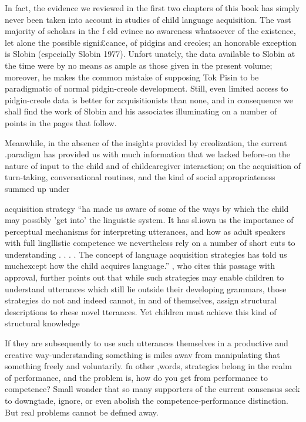 In fact, the evidence we reviewed in the first two chapters of this book has simply never been taken into account in studies of child language acquisition. The vast majority of scholars in the f eld evince no awareness whatsoever of the existence, let alone the possible signi£cance, of pidgins and creoles; an honorable exception is Slobin (especially Slobin 1977). Unfort unately, the data available to Slobin at the time were by no means as ample as those given in the present volume; moreover, he makes the common mistake of supposing Tok Pisin to be paradigmatic of normal pidgin-creole development. Still, even limited access to pidgin-creole data is better for acquisitionists than none, and in consequence we shall find the work of Slobin and his associates illuminating on a number of points in the pages that
follow.

Meanwhile, in the absence of the insights provided by creolization, the current .paradigm has provided us with much information that we lacked before{}-on the nature of input to the child and of child\-caregiver interaction; on the acquisition of turn-taking, conversational routines, and the kind of social appropriateness summed up under


{\textquotedbl}acquisition strategy{\textquotedbl} ``ha made us aware of some of the ways by which the child may possibly 'get into' the linguistic system. It has sl.iown us the importance of perceptual mechanisms for interpreting utterances, and how as adult speakers with full lingllistic competence we nevertheless rely on a number of short cuts to understanding . . . . The concept of language acquisition strategies has told us much\-except how the child acquires language.'' \citet{Bowerman1979} , who cites this passage with approval, further points out that while such strategies may enable children to understand utterances which still lie outside their developing grammars, those strategies do not and indeed cannot, in and of themselves, assign structural descriptions to rhese novel tterances. Yet children must achieve this kind of structural knowledge

If they are subsequently to use such utterances themselves in a produc\-tive and creative way-understanding something is miles awav from manipulating that something freely and voluntarily. fn other ,words, strategies belong in the realm of performance, and the problem is, how do you get from performance to competence? Small wonder that so many supporters of the current consensus seek to downgtade, ignore,
or even abolish the competence-performance distinction. But real problems cannot be defmed away.

